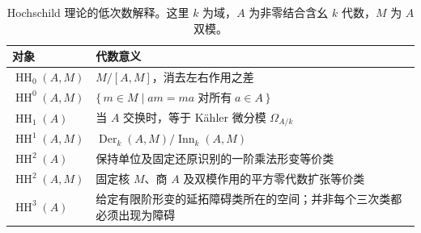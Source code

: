 \begin{table}[htbp]
	\centering
	\caption[Hochschild 理论的低次数解释]{Hochschild 理论的低次数解释。这里 \(k\) 为域，\(A\) 为非零结合含幺 \(k\) 代数，\(M\) 为 \(A\) 双模。}
	\label{b4:tab:hochschild-low-degrees}
	\begin{tabularx}{\textwidth}{@{}p{}>{\raggedright\arraybackslash}X@{}}
		\toprule
		对象 & 代数意义 \\
		\midrule
		\(\operatorname{HH}_0(A,M)\) & \(M/[A,M]\)，消去左右作用之差 \\
		\(\operatorname{HH}^0(A,M)\) & \(\{\,m\in M\mid am=ma\;\text{对所有}\;a\in A\,\}\) \\
		\(\operatorname{HH}_1(A)\) & 当 \(A\) 交换时，等于 Kähler 微分模 \(\Omega_{A/k}\) \\
		\(\operatorname{HH}^1(A,M)\) & \(\operatorname{Der}_k(A,M)/\operatorname{Inn}_k(A,M)\) \\
		\(\operatorname{HH}^2(A)\) & 保持单位及固定还原识别的一阶乘法形变等价类 \\
		\(\operatorname{HH}^2(A,M)\) & 固定核 \(M\)、商 \(A\) 及双模作用的平方零代数扩张等价类 \\
		\(\operatorname{HH}^3(A)\) & 给定有限阶形变的延拓障碍类所在的空间；并非每个三次类都必须出现为障碍 \\
		\bottomrule
	\end{tabularx}
\end{table}
